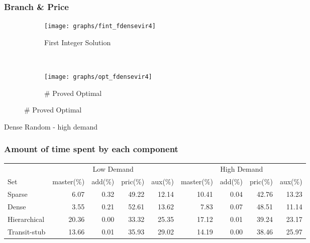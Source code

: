 \documentclass[english]{beamer}
\begin{document}
\begin{frame}
  \frametitle{Branch \& Price}
  \begin{figure}
          \begin{subfigure}[b]{0.47\textwidth}
                  \texttt{[image: graphs/fint\_fdensevir4]}
                  \caption{First Integer Solution}
          \end{subfigure}
          ~
          \begin{subfigure}[b]{0.47\textwidth}
                  \texttt{[image: graphs/opt\_fdensevir4]}
                  \caption{\# Proved Optimal}
          \end{subfigure}
  \end{figure}
  Dense Random - high demand
\end{frame}
\begin{frame}
  \frametitle{Amount of time spent by each component}

\begin{table}[h]
\begin{center}
\tiny
\begin{tabular} { l | r r r r | r r r r }
\hline
             &  \multicolumn{4}{c|}{Low Demand}                            & \multicolumn{4}{c}{High Demand} \\
Set          &  master(\%) &  add(\%)      &   pric(\%)            &  aux(\%)     & master(\%) &            add(\%)       &             pric(\%)  &  aux(\%) \\
\hline
Sparse       &  6.07   &            0.32             &               49.22  &  12.14  &  10.41  &            0.04             &               42.76  &  13.23  \\
Dense        &  3.55   &            0.21             &               52.61  &  13.62  &  7.83   &            0.07             &               48.51  &  11.14  \\
Hierarchical &  20.36  &            0.00             &               33.32  &  25.35  &  17.12  &            0.01             &               39.24  &  23.17  \\
Transit-stub &  13.66  &            0.01             &               35.93  &  29.02  &  14.19  &            0.00             &               38.46  &  25.97  \\
\hline
\end{tabular} 
\end{center}
\end{table}
\end{frame}
\end{document}
